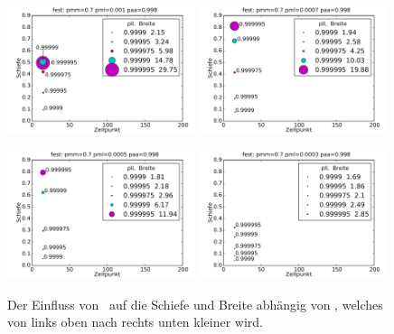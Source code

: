 \begin{figure}[H]
\includegraphics[width=0.49\textwidth]{bilder/pll/3fest_07_0001_0998_p}
\includegraphics[width=0.49\textwidth]{bilder/pll/3fest_07_00007_0998_p}

\vspace*{5pt}

\includegraphics[width=0.49\textwidth]{bilder/pll/3fest_07_00005_0998_p}
\includegraphics[width=0.49\textwidth]{bilder/pll/3fest_07_00003_0998_p}
\caption[Der Einfluss von \pll\ auf die Schiefe und Breite abhängig von \pml]{Der Einfluss von \pll\ auf die Schiefe und Breite abhängig von \pml, welches von links oben nach rechts unten kleiner wird.}
\label{einfluss_pll_pml}
\end{figure}

